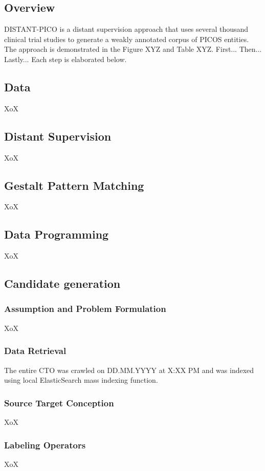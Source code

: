 \documentclass[10.7pt,]{article}
\begin{document}
\subsection{Overview}\label{overview}
%
DISTANT-PICO is a distant supervision approach that uses several thousand clinical trial studies to generate a weakly annotated corpus of PICOS entities.
The approach is demonstrated in the Figure XYZ and Table XYZ.
First...
Then...
Lastly...
Each step is elaborated below.
%
%
%
\subsection{Data}\label{data}
%
XoX 
%
%
%
\subsection{Distant Supervision}
%
XoX
%
%
%
\subsection{Gestalt Pattern Matching}
%
XoX
%
%
%
\subsection{Data Programming}
%
XoX
%
%
%
\subsection{Candidate generation}\label{candgen}
%
\subsubsection{Assumption and Problem Formulation}
%
XoX
%
%
\subsubsection{Data Retrieval}
%
The entire CTO was crawled on DD.MM.YYYY at X:XX PM and was indexed using local ElasticSearch mass indexing function. 
%
%
\subsubsection{Source Target Conception}
%
XoX
%
%
\subsubsection{Labeling Operators}
%
XoX
%
%
\end{document}
